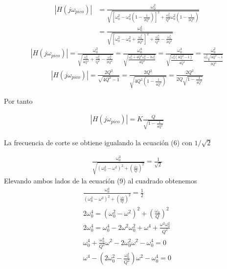 \documentclass[12pt,a4paper]{article}
\begin{document}
	\begin{align}
		|H(j\omega_{pico})| &= \frac{\omega_0^2}{\sqrt{\left[ \omega_0^2  - \omega_0^2 \left( 1 - \frac{1}{2Q^2} \right) \right]^2 + \frac{\omega_0^2}{Q^2}\omega_0^2\left( 1 - \frac{1}{2Q^2} \right) } }\nonumber\\
		&=\frac{\omega_0^2}{ \sqrt{\left[ \omega_0^2 - \omega_0^2 + \frac{\omega_0^2}{2Q^2} \right]^2 + \frac{\omega_0^4}{Q^2} - \frac{\omega_0^4}{2Q^4} } }\nonumber
	\end{align}
	\begin{align}
		|H(j\omega_{pico})| = \frac{\omega_0^2}{ \sqrt{ \frac{\omega_0^4}{4Q^4} + \frac{\omega_0^4}{Q^2} - \frac{\omega_0^4}{2Q^4} } } = \frac{\omega_0^4}{ \sqrt{ \frac{\omega_0^4 + 4Q^2\omega_0^4 - 2\omega_0^4}{4Q^4} } } = \frac{\omega_0^4}{ \sqrt{ \frac{\omega_0^4(4Q^2 - 1)}{4Q^4} } } = \frac{\omega_0^2}{ \frac{\omega_0^2\sqrt{4Q^2 - 1}}{2Q^2} }\nonumber
	\end{align}
	\begin{align}
		|H(j\omega_{pico})| = \frac{2Q^2}{ \sqrt{4Q^2 - 1} } = \frac{2Q^2}{\sqrt{4Q^2\left( 1 - \frac{1}{4Q^2} \right) }} = \frac{2Q^2}{2Q\sqrt{1 - \frac{1}{4Q^2}} }\nonumber
	\end{align}

	Por tanto
	\begin{tcolorbox}[colback=red!5!white,colframe=red!75!black,width=(\linewidth+0.45cm)]
		\begin{align}
			|H(j\omega_{pico})| = K\frac{Q}{\sqrt{1 - \frac{1}{4Q^2}}}
		\end{align}	
	\end{tcolorbox}
	
	La frecuencia de corte se obtiene igualando la ecuación (6) con $1/\sqrt{2}$
	
	\begin{align}
		\frac{\omega_0^2}{ \sqrt{(\omega_0^2 - \omega^2)^2 + \left( \frac{\omega_0}{Q} \right)^2} } = \frac{1}{\sqrt{2}}
	\end{align}
	Elevando ambos lados de la ecuación (9) al cuadrado obtenemos
	\begin{align}
		\frac{\omega_0^4}{(\omega_0^2 - \omega^2)^2 + \left( \frac{\omega_0}{Q} \right)^2} = \frac{1}{2}\nonumber\\
		2\omega_0^4 = (\omega_0^2 - \omega^2)^2 + \left( \frac{\omega_0}{Q} \right)^2\nonumber\\
		2\omega_0^4 = \omega_0^4 - 2\omega^2\omega_0^2 + \omega^4 + \frac{\omega^2\omega_0^2}{Q^2}\nonumber\\
		\omega_0^4 + \frac{\omega_0^4}{Q^2}\omega^2 - 2\omega_0^2\omega^2 - \omega_0^4 = 0\nonumber\\
		\omega^4 - \left( 2\omega_0^2 - \frac{\omega_0^2}{Q^2} \right)\omega^2 - \omega_0^4 = 0\nonumber
	\end{align}
\end{document}
